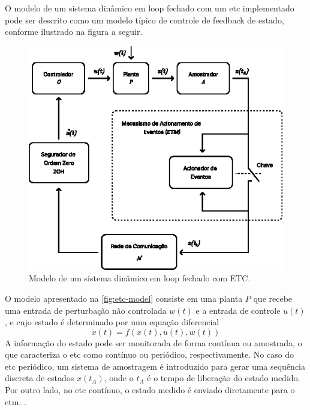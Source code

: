 O modelo de um sistema dinâmico em loop fechado com um \acrshort{etc} implementado pode ser descrito como um modelo típico de controle de feedback de estado, conforme ilustrado na figura a seguir.

\begin{figure}[H]
  \centering
  \includegraphics[scale=2.]{figuras/etc-model.eps}
  \caption{Modelo de um sistema dinâmico em loop fechado com ETC.}
  \label{fig:etc-model}
\end{figure}

O modelo apresentado na \autoref{fig:etc-model} consiste em uma planta $ P$ que recebe uma entrada de perturbação não controlada $w(t)$ e a entrada de controle $u(t)$, e cujo estado é determinado por uma equação diferencial \begin{equation}\dot{x}(t) = f(x(t), u(t), w(t))\end{equation} A informação do estado pode ser monitorada de forma contínua ou amostrada, o que caracteriza o \acrshort{etc} como contínuo ou periódico, respectivamente. No caso do \acrshort{etc} periódico, um sistema de amostragem é introduzido para gerar uma sequência discreta de estados $x(t_A)$, onde o $t_A$ é o tempo de liberação do estado medido. Por outro lado, no \acrshort{etc} contínuo, o estado medido é enviado diretamente para o \acrshort{etm}. \cite{peng2018,coutinho2021,Lemmon2010}.

